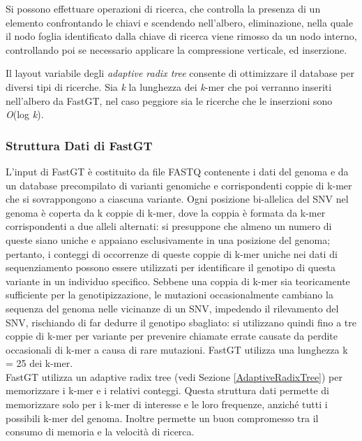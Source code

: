 \documentclass[../main.tex]{subfiles}
\begin{document}
Si possono effettuare operazioni di ricerca, che controlla la presenza di un elemento confrontando le chiavi e scendendo nell'albero, eliminazione, nella quale il nodo foglia identificato dalla chiave di ricerca viene rimosso da un nodo interno, controllando poi se necessario applicare la compressione verticale, ed inserzione.

Il layout variabile degli \textit{adaptive radix tree} consente di ottimizzare il database per diversi tipi di ricerche. Sia \textit{k} la lunghezza dei \textit{k}-mer che poi verranno inseriti nell'albero da FastGT, nel caso peggiore sia le ricerche che le inserzioni sono \textit{O}(log \textit{k}).



\subsubsection{Struttura Dati di FastGT}
\label{strutturaDatiFastGT}

L'input di FastGT è costituito da file FASTQ contenente i dati del genoma e da un database precompilato di varianti genomiche e corrispondenti coppie di k-mer che si sovrappongono a ciascuna variante. Ogni posizione bi-allelica del SNV nel genoma è coperta da k coppie di k-mer, dove la coppia è formata da k-mer corrispondenti a due alleli alternati: si presuppone che almeno un numero di queste siano uniche e appaiano esclusivamente in una posizione del genoma; pertanto, i conteggi di occorrenze di queste coppie di k-mer uniche nei dati di sequenziamento possono essere utilizzati per identificare il genotipo di questa variante in un individuo specifico. Sebbene una coppia di k-mer sia teoricamente sufficiente per la genotipizzazione, le mutazioni occasionalmente cambiano la sequenza del genoma nelle vicinanze di un SNV, impedendo il rilevamento del SNV, rischiando di far dedurre il genotipo sbagliato: si utilizzano quindi fino a tre coppie di k-mer per variante per prevenire chiamate errate causate da perdite occasionali di k-mer a causa di rare mutazioni. FastGT utilizza una lunghezza k = 25 dei k-mer. \\

\noindent
FastGT utilizza un adaptive radix tree (vedi Sezione \ref{AdaptiveRadixTree}) per memorizzare i k-mer e i relativi conteggi. Questa struttura dati permette di memorizzare  solo per i k-mer di interesse e le loro frequenze, anziché tutti i possibili k-mer del genoma. Inoltre permette un buon compromesso tra il consumo di memoria e la velocità di ricerca. 
\end{document}
